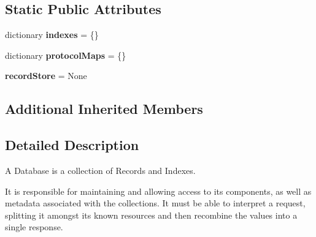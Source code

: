 \subsection*{Static Public Attributes}
\begin{DoxyCompactItemize}
\item 
\hypertarget{classcheshire3_1_1base_objects_1_1_database_a1f3ce822c49cb0174b73e56a8f1204ca}{dictionary {\bfseries indexes} = \{\}}\label{classcheshire3_1_1base_objects_1_1_database_a1f3ce822c49cb0174b73e56a8f1204ca}

\item 
\hypertarget{classcheshire3_1_1base_objects_1_1_database_a00a6e2f3266cc6819aa97abcc59fca89}{dictionary {\bfseries protocol\-Maps} = \{\}}\label{classcheshire3_1_1base_objects_1_1_database_a00a6e2f3266cc6819aa97abcc59fca89}

\item 
\hypertarget{classcheshire3_1_1base_objects_1_1_database_aea0fab0d5dc46ae977668f6d0a903c6f}{{\bfseries record\-Store} = None}\label{classcheshire3_1_1base_objects_1_1_database_aea0fab0d5dc46ae977668f6d0a903c6f}

\end{DoxyCompactItemize}
\subsection*{Additional Inherited Members}


\subsection{Detailed Description}
\begin{DoxyVerb}A Database is a collection of Records and Indexes.

It is responsible for maintaining and allowing access to its components, 
as well as metadata associated with the collections. It must be able to 
interpret a request, splitting it amongst its known resources and then 
recombine the values into a single response.
\end{DoxyVerb}
 


